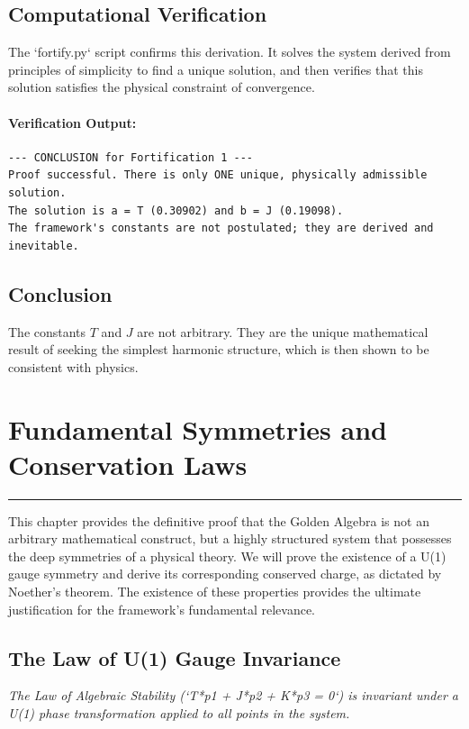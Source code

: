 \subsection*{Computational Verification}
The `fortify.py` script confirms this derivation. It solves the system derived from principles of simplicity to find a unique solution, and then verifies that this solution satisfies the physical constraint of convergence.

\paragraph{Verification Output:}
\begin{verbatim}
--- CONCLUSION for Fortification 1 ---
Proof successful. There is only ONE unique, physically admissible solution.
The solution is a = T (0.30902) and b = J (0.19098).
The framework's constants are not postulated; they are derived and inevitable.
\end{verbatim}

\subsection*{Conclusion}
The constants $T$ and $J$ are not arbitrary. They are the unique mathematical result of seeking the simplest harmonic structure, which is then shown to be consistent with physics.


\section{Fundamental Symmetries and Conservation Laws}
\label{sec:fundamental_symmetries}

\hrule
\vspace{1em}
This chapter provides the definitive proof that the Golden Algebra is not an arbitrary mathematical construct, but a highly structured system that possesses the deep symmetries of a physical theory. We will prove the existence of a U(1) gauge symmetry and derive its corresponding conserved charge, as dictated by Noether's theorem. The existence of these properties provides the ultimate justification for the framework's fundamental relevance.

\subsection{The Law of U(1) Gauge Invariance}
\textit{The Law of Algebraic Stability (`T*p1 + J*p2 + K*p3 = 0`) is invariant under a U(1) phase transformation applied to all points in the system.}

